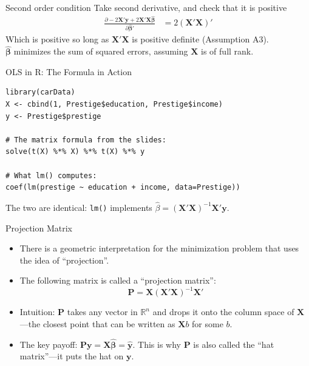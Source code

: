\documentclass[aspectratio=169, handout]{beamer}
\numberwithin{equation}{section}
\begin{document}
\begin{frame}{Second order condition}
Take second derivative, and check that it is positive
\begin{align*}
\frac{\partial -2\bm{X}'\bm{y}+2\bm{X}'\bm{X}\bm{\hat{\beta}}}{\partial \bm{\hat{\beta}'}}&=2(\bm{X}'\bm{X})'
\end{align*}
Which is positive so long as $\bm{X}'\bm{X}$ is positive definite (Assumption A3).\\
$\bm{\hat{\beta}}$ minimizes the sum of squared errors, assuming $\bm{X}$ is of full rank.
\end{frame}

\begin{frame}[fragile]{OLS in R: The Formula in Action}
\begin{lstlisting}
library(carData)
X <- cbind(1, Prestige$education, Prestige$income)
y <- Prestige$prestige

# The matrix formula from the slides:
solve(t(X) %*% X) %*% t(X) %*% y

# What lm() computes:
coef(lm(prestige ~ education + income, data=Prestige))
\end{lstlisting}
\vspace{1ex}
The two are identical: \texttt{lm()} implements $\hat{\beta}=(\bm{X'X})^{-1}\bm{X'y}$.
\end{frame}

\begin{frame}{Projection Matrix}
\begin{itemize}
\item There is a geometric interpretation for the minimization problem that uses the idea of ``projection''.
\item The following matrix is called a ``projection matrix'':
$$\bm{P}=\bm{X}(\bm{X}'\bm{X})^{-1}\bm{X}'$$
\item Intuition: $\bm{P}$ takes any vector in $\mathbb{R}^n$ and drops it onto the column space of $\bm{X}$---the closest point that can be written as $\bm{X}b$ for some $b$.\pause
\item The key payoff: $\bm{P}\bm{y}=\bm{X}\bm{\hat{\beta}}=\bm{\hat{y}}$. This is why $\bm{P}$ is also called the ``hat matrix''---it puts the hat on $\bm{y}$.
\end{itemize}
\end{frame}
\end{document}
